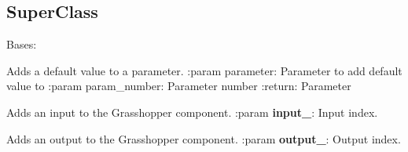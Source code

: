 \documentclass[letterpaper,10pt,english]{sphinxmanual}
\begin{document}
\subsection{SuperClass}
\label{\detokenize{superclass:superclass}}\label{\detokenize{superclass::doc}}\label{\detokenize{superclass:module-livestock.components.component}}

\begin{fulllineitems}
\label{\detokenize{superclass:livestock.components.component.GHComponent}}
Bases: 

\begin{fulllineitems}
\label{\detokenize{superclass:livestock.components.component.GHComponent.add_default_value}}
Adds a default value to a parameter.
:param parameter: Parameter to add default value to
:param param\_number: Parameter number
:return: Parameter

\end{fulllineitems}


\begin{fulllineitems}
\label{\detokenize{superclass:livestock.components.component.GHComponent.add_input_parameter}}
Adds an input to the Grasshopper component.
:param {\color{red}\bfseries{}input\_}: Input index.

\end{fulllineitems}


\begin{fulllineitems}
\label{\detokenize{superclass:livestock.components.component.GHComponent.add_output_parameter}}
Adds an output to the Grasshopper component.
:param {\color{red}\bfseries{}output\_}: Output index.


\end{fulllineitems}
\end{fulllineitems}
\end{document}
